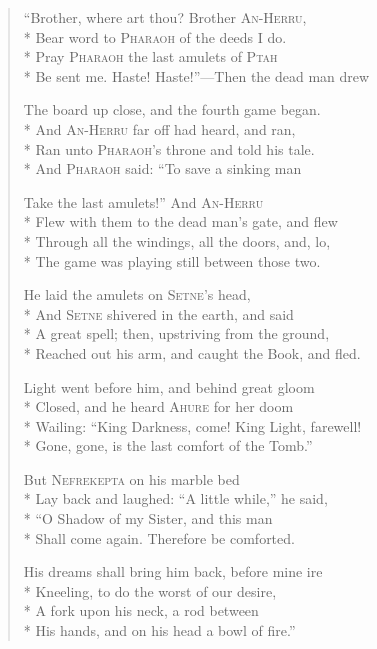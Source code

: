 \documentclass[12pt]{article}
\newcommand{\vin}{\hspace{1em}}
\begin{document}
\begin{verse}
``Brother, where art thou? Brother \textsc{An-Herru},\\*
Bear word to \textsc{Pharaoh} of the deeds I do.\\*
\vin Pray \textsc{Pharaoh} the last amulets of \textsc{Ptah}\\*
Be sent me. Haste! Haste!''---Then the dead man drew

The board up close, and the fourth game began.\\*
And \textsc{An-Herru} far off had heard, and ran,\\*
\vin Ran unto \textsc{Pharaoh}'s throne and told his tale.\\*
And \textsc{Pharaoh} said: ``To save a sinking man

Take the last amulets!'' And \textsc{An-Herru}\\*
Flew with them to the dead man's gate, and flew\\*
\vin Through all the windings, all the doors, and, lo,\\*
The game was playing still between those two.

He laid the amulets on \textsc{Setne}'s head,\\*
And \textsc{Setne} shivered in the earth, and said\\*
\vin A great spell; then, upstriving from the ground,\\*
Reached out his arm, and caught the Book, and fled.

Light went before him, and behind great gloom\\*
Closed, and he heard \textsc{Ahure} for her doom\\*
\vin Wailing: ``King Darkness, come! King Light, farewell!\\*
Gone, gone, is the last comfort of the Tomb.''

But \textsc{Nefrekepta} on his marble bed\\*
Lay back and laughed: ``A little while,'' he said,\\*
\vin ``O Shadow of my Sister, and this man\\*
Shall come again. Therefore be comforted.

His dreams shall bring him back, before mine ire\\*
Kneeling, to do the worst of our desire,\\*
\vin A fork upon his neck, a rod between\\*
His hands, and on his head a bowl of fire.''
\end{verse}
\end{document}
